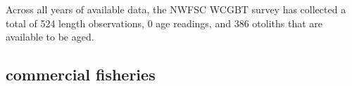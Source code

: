 \documentclass[11pt,
  english,
  letterpaper,
]{article}
\begin{document}

Across all years of available data, the NWFSC WCGBT survey has collected a total of 524 length observations, 0 age readings, and 386 otoliths that are available to be aged.

\leavevmode\tagmcend\tagstructend\par


\hypertarget{commercial-fisheries-8}{%
\subsection{commercial fisheries}\label{commercial-fisheries-8}}

\leavevmode\tagmcend\tagstructend


\begingroup\fontsize{10}{12}\selectfont \begingroup\fontsize{10}{12}\selectfont

\leavevmode\tagmcend\tagstructend\par
\end{document}
